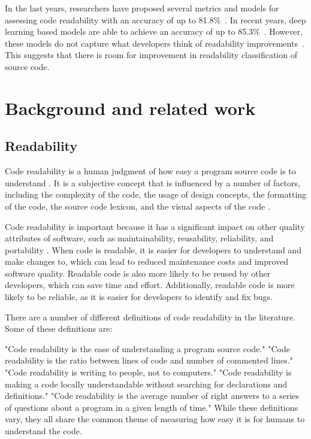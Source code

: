 \documentclass[%
class=scrreprt,
chapterprefix=false,%
open=right,%
twoside=false,%
paper=a4,%
logofile={Logo\_zentral\_farbig\_EN.png},%
thesistype=master,%
UKenglish,%
]{se2thesis}
\begin{document}
	In the last years, researchers have proposed several metrics and models for assessing code readability with an accuracy of up to 81.8\%~\cite{buse2009learning, posnett2011simpler, dorn2012general, daka2015modeling}. In recent years, deep learning based models are able to achieve an accuracy of up to 85.3\%~\cite{mi2018improving, mi2022towards}.
	However, these models do not capture what developers think of readability improvements~\cite{fakhoury2019improving}. This suggests that there is room for improvement in readability classification of source code.
	
	\section{Background and related work} \label{Background and related work}
	
	\subsection{Readability} \label{Readability}
	Code readability is a human judgment of how easy a program source code is to understand \cite{buse2008evaluating}. It is a subjective concept that is influenced by a number of factors, including the complexity of the code, the usage of design concepts, the formatting of the code, the source code lexicon, and the visual aspects of the code \cite{scalabrino2018comprehensive}.
	
	Code readability is important because it has a significant impact on other quality attributes of software, such as maintainability, reusability, reliability, and portability \cite{tashtoush2013impact}. When code is readable, it is easier for developers to understand and make changes to, which can lead to reduced maintenance costs and improved software quality. Readable code is also more likely to be reused by other developers, which can save time and effort. Additionally, readable code is more likely to be reliable, as it is easier for developers to identify and fix bugs.
	
	There are a number of different definitions of code readability in the literature. Some of these definitions are:
	
	"Code readability is the ease of understanding a program source code." \cite{buse2008evaluating}
	"Code readability is the ratio between lines of code and number of commented lines." \cite{sedano2016code}
	"Code readability is writing to people, not to computers." \cite{oliveira2020evaluating}
	"Code readability is making a code locally understandable without searching for declarations and definitions." \cite{oliveira2020evaluating}
	"Code readability is the average number of right answers to a series of questions about a program in a given length of time." \cite{oliveira2020evaluating}
	While these definitions vary, they all share the common theme of measuring how easy it is for humans to understand the code.
	
\end{document}
